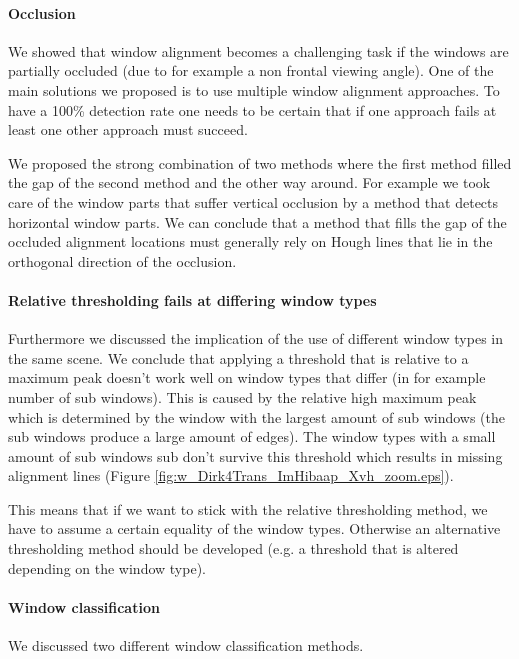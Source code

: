 	\paragraph{Occlusion}
	We showed that window alignment becomes a challenging task if the windows are partially
	occluded (due to for example a non frontal viewing angle).  One of the main solutions 
	we proposed is to use multiple window
	alignment approaches.  To have a 100\% detection rate one needs to be certain
	that if one approach fails at least one other approach must succeed.  
	
	We proposed the strong combination of two methods where the first method filled the
	gap of the second method and the other way around.
	For example we took care of the window parts that suffer vertical occlusion by a method that
	detects horizontal window parts.  We can conclude that a method that fills the
	gap of the occluded alignment locations must generally rely on Hough lines that
	lie in the orthogonal direction of the occlusion.

	\paragraph{Relative thresholding fails at differing window types}
	Furthermore we discussed the implication of the use of different window types in
	the same scene.  We conclude that applying a threshold that is relative to a
	maximum peak doesn't work well on window types that differ (in for example
	number of sub windows).  This is caused by the relative high maximum peak
	which is determined by the window with the largest amount of sub windows
	(the sub windows produce a large amount of edges).  The window types with
	a small amount of sub windows sub don't survive this
	threshold which results in missing alignment lines (Figure
	\ref{fig:w_Dirk4Trans_ImHibaap_Xvh_zoom.eps}).  
	
	This means that if we want to stick with the relative thresholding method,
	we have to assume a certain equality of the window types. Otherwise an
	alternative thresholding method should be developed (e.g. a threshold that
	is altered depending on the window type).



\paragraph{Window classification} %
	We discussed two different window classification methods. 
